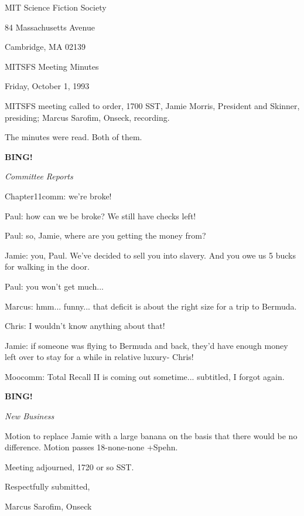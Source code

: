 \documentclass[12pt]{article}
\newcommand{\bing}{{\bf BING!} }
\newcommand{\goto}[1]{\bing \vskip 12pt \centerline{{\em{#1}}}}
\begin{document}
\begin{center}

MIT Science Fiction Society 

84 Massachusetts Avenue

Cambridge, MA 02139

\vspace{12pt}

MITSFS Meeting Minutes 

Friday, October 1, 1993

\end{center}
 
\vspace{18pt}

\setlength{\parskip}{6pt}

\noindent
MITSFS meeting called to order, 1700 SST,
Jamie Morris, President and Skinner, presiding; Marcus Sarofim, Onseck, recording.

The minutes were read. Both of them.

\goto{Committee Reports}

Chapter11comm: we're broke!

Paul: how can we be broke? We still have checks left!

Paul: so, Jamie, where are you getting the money from?

Jamie: you, Paul. We've decided to sell you into slavery. And you owe us 5 bucks for walking in the door.

Paul: you won't get much...

Marcus: hmm... funny... that deficit is about the right size for a trip to Bermuda.

Chris: I wouldn't know anything about that!

Jamie: if someone was flying to Bermuda and back, they'd have enough money left over to stay for a while in relative luxury- Chris!

Moocomm: Total Recall II is coming out sometime... subtitled, I forgot again.

\goto{New Business}

Motion to replace Jamie with a large banana on the basis that there would be no difference. Motion passes 18-none-none +Spehn.

\vspace{12pt}

\noindent
Meeting adjourned, 1720 or so SST.

\vspace{18pt}

\centerline{Respectfully submitted,}
\centerline{Marcus Sarofim, Onseck}
\end{document}
